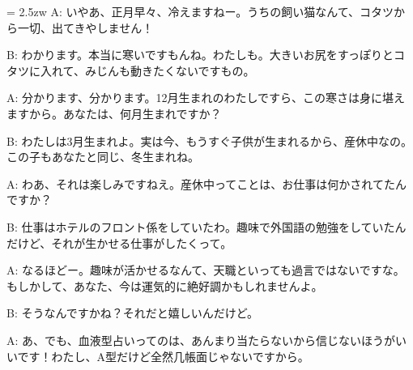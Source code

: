 \documentclass[11pt]{amsart}
\title{}
\author{}
\newenvironment{hangall}[1]{\hangindent = 2.5zw\everypar{\hangindent = 2.5zw}}{}
\begin{document}
\maketitle
\begin{hangall}{}%
A: いやあ、正月早々、冷えますねー。うちの飼い猫なんて、コタツから一切、出てきやしません！



B: わかります。本当に寒いですもんね。わたしも。大きいお尻をすっぽりとコタツに入れて、みじんも動きたくないですもの。



A: 分かります、分かります。12月生まれのわたしですら、この寒さは身に堪えますから。あなたは、何月生まれですか？



B: わたしは3月生まれよ。実は今、もうすぐ子供が生まれるから、産休中なの。この子もあなたと同じ、冬生まれね。



A: わあ、それは楽しみですねえ。産休中ってことは、お仕事は何かされてたんですか？



B: 仕事はホテルのフロント係をしていたわ。趣味で外国語の勉強をしていたんだけど、それが生かせる仕事がしたくって。



A: なるほどー。趣味が活かせるなんて、天職といっても過言ではないですな。もしかして、あなた、今は運気的に絶好調かもしれませんよ。



B: そうなんですかね？それだと嬉しいんだけど。



A: あ、でも、血液型占いってのは、あんまり当たらないから信じないほうがいいです！わたし、A型だけど全然几帳面じゃないですから。\end{hangall}
\end{document}
